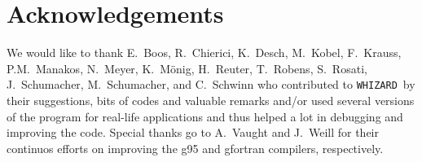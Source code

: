 \documentclass[12pt]{book}
\newcommand{\whizard}{\texttt{WHIZARD}}
\begin{document}





\clearpage
\section*{Acknowledgements}

We would like to thank E.~Boos, R.~Chierici, K.~Desch, M.~Kobel,
F.~Krauss, P.M.~Manakos, N.~Meyer, K.~M\"onig, H.~Reuter, T.~Robens,
S.~Rosati, J.~Schumacher, M.~Schumacher, and C.~Schwinn who
contributed to \whizard\ by their suggestions, bits of codes and
valuable remarks and/or used several versions of the program for
real-life applications and thus helped a lot in debugging and
improving the code.  Special thanks go to A.~Vaught and J.~Weill for
their continuos efforts on improving the g95 and gfortran compilers,
respectively. 
\end{document}
